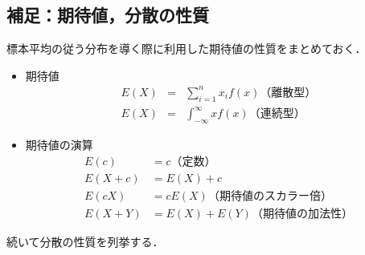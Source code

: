 \newpage

\subsection{補足：期待値，分散の性質}

標本平均の従う分布を導く際に利用した期待値の性質をまとめておく．

\begin{itemize}
  \item 期待値
        \begin{eqnarray}
          E(X) & = & \sum_{i=1}^{n} x_i f(x)（離散型）\\
          E(X) & = & \int_{-\infty}^{\infty} x f(x)（連続型）
        \end{eqnarray}
  \item 期待値の演算
        \begin{equation}
          \begin{aligned}
            E(c)     & = c（定数）                     \\
            E(X + c) & = E(X) + c                      \\
            E(cX)    & = c E(X)（期待値のスカラー倍）  \\
            E(X + Y) & = E(X) + E(Y)（期待値の加法性）
          \end{aligned}
        \end{equation}
\end{itemize}

続いて分散の性質を列挙する．

